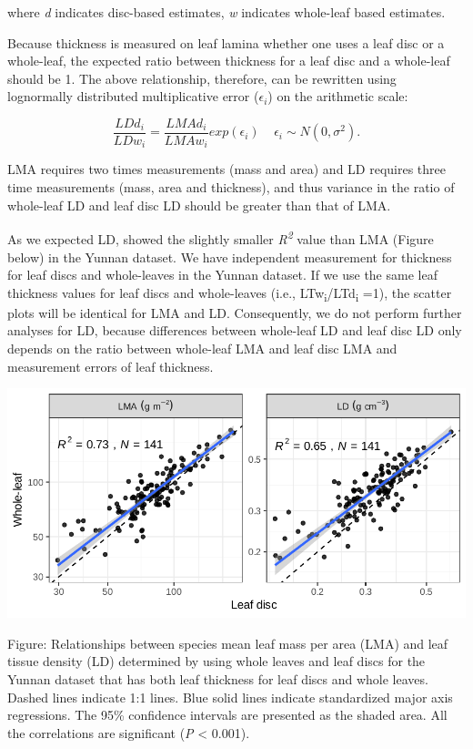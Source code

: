 \documentclass[
  12pt,
  a4paper,
,tablecaptionabove
]{scrartcl}
\begin{document}
where \emph{d} indicates disc-based estimates, \emph{w} indicates
whole-leaf based estimates.

Because thickness is measured on leaf lamina whether one uses a leaf
disc or a whole-leaf, the expected ratio between thickness for a leaf
disc and a whole-leaf should be 1. The above relationship, therefore,
can be rewritten using lognormally distributed multiplicative error
(\(\epsilon_i\)) on the arithmetic scale:

\[
\frac{LDd_i}{LDw_i} = \frac{LMAd_i}{LMAw_i} exp(\epsilon_i) \;\;\;\;\epsilon_i \sim N(0, \sigma^2).
\]

LMA requires two times measurements (mass and area) and LD requires
three time measurements (mass, area and thickness), and thus variance in
the ratio of whole-leaf LD and leaf disc LD should be greater than that
of LMA.

As we expected LD, showed the slightly smaller
\emph{R\textsuperscript{2}} value than LMA (Figure below) in the Yunnan
dataset. We have independent measurement for thickness for leaf discs
and whole-leaves in the Yunnan dataset. If we use the same leaf
thickness values for leaf discs and whole-leaves (i.e.,
LTw\textsubscript{i}/LTd\textsubscript{i} =1), the scatter plots will be
identical for LMA and LD. Consequently, we do not perform further
analyses for LD, because differences between whole-leaf LD and leaf disc
LD only depends on the ratio between whole-leaf LMA and leaf disc LMA
and measurement errors of leaf thickness.

\includegraphics[width=6.25in,height=\textheight]{../figs/lma_ld.pdf}

Figure: Relationships between species mean leaf mass per area (LMA) and
leaf tissue density (LD) determined by using whole leaves and leaf discs
for the Yunnan dataset that has both leaf thickness for leaf discs and
whole leaves. Dashed lines indicate 1:1 lines. Blue solid lines indicate
standardized major axis regressions. The 95\% confidence intervals are
presented as the shaded area. All the correlations are significant
(\emph{P} \textless{} 0.001).
\end{document}
